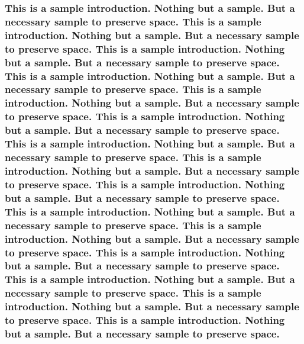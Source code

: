 \documentclass[american,]{article}
\begin{document}
{\subsubsection{This is a sample introduction. Nothing but a sample. But a necessary sample to preserve space. This is a sample introduction. Nothing but a sample. But a necessary sample to preserve space. This is a sample introduction. Nothing but a sample. But a necessary sample to preserve space. This is a sample introduction. Nothing but a sample. But a necessary sample to preserve space. This is a sample introduction. Nothing but a sample. But a necessary sample to preserve space. This is a sample introduction. Nothing but a sample. But a necessary sample to preserve space. This is a sample introduction. Nothing but a sample. But a necessary sample to preserve space. This is a sample introduction. Nothing but a sample. But a necessary sample to preserve space. This is a sample introduction. Nothing but a sample. But a necessary sample to preserve space. This is a sample introduction. Nothing but a sample. But a necessary sample to preserve space. This is a sample introduction. Nothing but a sample. But a necessary sample to preserve space. This is a sample introduction. Nothing but a sample. But a necessary sample to preserve space. This is a sample introduction. Nothing but a sample. But a necessary sample to preserve space. This is a sample introduction. Nothing but a sample. But a necessary sample to preserve space. This is a sample introduction. Nothing but a sample. But a necessary sample to preserve space.}\label{this-is-a-sample-introduction.-nothing-but-a-sample.-but-a-necessary-sample-to-preserve-space.-this-is-a-sample-introduction.-nothing-but-a-sample.-but-a-necessary-sample-to-preserve-space.-this-is-a-sample-introduction.-nothing-but-a-sample.-but-a-necessary-sample-to-preserve-space.-this-is-a-sample-introduction.-nothing-but-a-sample.-but-a-necessary-sample-to-preserve-space.-this-is-a-sample-introduction.-nothing-but-a-sample.-but-a-necessary-sample-to-preserve-space.-this-is-a-sample-introduction.-nothing-but-a-sample.-but-a-necessary-sample-to-preserve-space.-this-is-a-sample-introduction.-nothing-but-a-sample.-but-a-necessary-sample-to-preserve-space.-this-is-a-sample-introduction.-nothing-but-a-sample.-but-a-necessary-sample-to-preserve-space.-this-is-a-sample-introduction.-nothing-but-a-sample.-but-a-necessary-sample-to-preserve-space.-this-is-a-sample-introduction.-nothing-but-a-sample.-but-a-necessary-sample-to-preserve-space.-this-is-a-sample-introduction.-nothing-but-a-sample.-but-a-necessary-sample-to-preserve-space.-this-is-a-sample-introduction.-nothing-but-a-sample.-but-a-necessary-sample-to-preserve-space.-this-is-a-sample-introduction.-nothing-but-a-sample.-but-a-necessary-sample-to-preserve-space.-this-is-a-sample-introduction.-nothing-but-a-sample.-but-a-necessary-sample-to-preserve-space.-this-is-a-sample-introduction.-nothing-but-a-sample.-but-a-necessary-sample-to-preserve-space.}}
\end{document}
